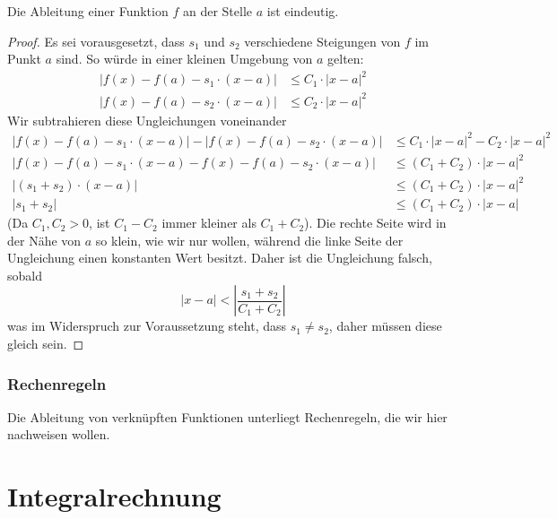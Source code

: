 \begin{lemma}
Die Ableitung einer Funktion $f$ an der Stelle $a$ ist eindeutig. 
\end{lemma}
\begin{proof}
Es sei vorausgesetzt, dass $s_1$ und $s_2$ verschiedene Steigungen von $f$ im Punkt $a$ sind. So würde in einer kleinen Umgebung von $a$ gelten:
\begin{equation*}
\begin{split}
|f(x)-f(a) -s_1\cdot (x-a)| &\le C_1\cdot |x-a|^2 \\
|f(x)-f(a) -s_2\cdot (x-a)| &\le C_2\cdot |x-a|^2
\end{split}
\end{equation*}
Wir subtrahieren diese Ungleichungen voneinander
\begin{equation}
\begin{split}
|f(x)-f(a) -s_1\cdot (x-a)|-|f(x)-f(a) -s_2\cdot (x-a)| &\le C_1\cdot |x-a|^2-C_2\cdot |x-a|^2 \\
|f(x)-f(a) -s_1\cdot (x-a)-f(x)-f(a) -s_2\cdot (x-a)| &\le (C_1+C_2)\cdot |x-a|^2 \\
|(s_1+s_2)\cdot (x-a)| &\le (C_1+C_2)\cdot |x-a|^2 \\
|s_1+s_2| &\le (C_1+C_2)\cdot |x-a|
\end{split}
\end{equation}
(Da $C_1,C_2 >0$, ist $C_1-C_2$ immer kleiner als $C_1+C_2$). Die rechte Seite wird in der Nähe von $a$ so klein, wie wir nur wollen, während die linke Seite der Ungleichung einen konstanten Wert besitzt. Daher ist die Ungleichung falsch, sobald 
\[
|x-a| < \left| \frac{s_1+s_2}{C_1+C_2} \right|
\]
was im Widerspruch zur Voraussetzung steht, dass $s_1\ne s_2$, daher müssen diese gleich sein.
\end{proof}

\subsection{Rechenregeln}

Die Ableitung von verknüpften Funktionen unterliegt Rechenregeln, die wir hier nachweisen wollen. 


\chapter{Integralrechnung}


